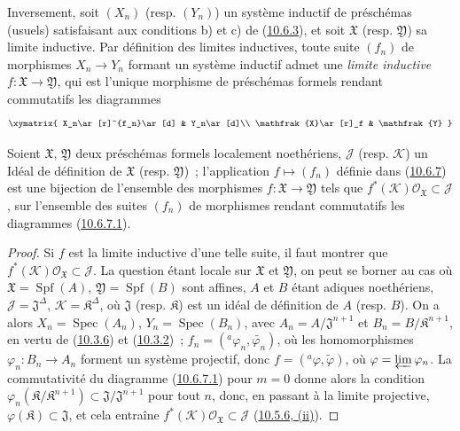 \begin{env}[10.6.8]
\label{I.10.6.8-fr}
Inversement, soit $(X_n)$ (resp. $(Y_n)$) un système inductif de
préschémas (usuels) satisfaisant aux conditions b) et c) de
(\hyperref[I.10.6.3-fr]{10.6.3}), et soit $\mathfrak{X}$ (resp.
$\mathfrak{Y}$) sa limite inductive. Par définition des limites
inductives, toute suite $(f_n)$ de morphismes $X_n\to Y_n$ formant un
système inductif admet une \emph{limite inductive}
$f:\mathfrak{X}\to\mathfrak{Y}$, qui est l'unique morphisme de
préschémas formels rendant commutatifs les diagrammes
\[
  \xymatrix{
    X_n\ar[r]^{f_n}\ar[d] &
    Y_n\ar[d]\\
    \mathfrak{X}\ar[r]_f &
    \mathfrak{Y}
  }
\]
\end{env}

\begin{proposition}[10.6.9]
\label{I.10.6.9-fr}
Soient $\mathfrak{X}$, $\mathfrak{Y}$ deux préschémas formels
localement noethériens, $\mathscr{J}$ (resp. $\mathscr{K}$) un Idéal
de définition de $\mathfrak{X}$ (resp. $\mathfrak{Y}$)~;
l'application $f\mapsto(f_n)$ définie dans
(\hyperref[I.10.6.7-fr]{10.6.7}) est une bijection de l'ensemble des
morphismes $f:\mathfrak{X}\to\mathfrak{Y}$ tels que
$f^*(\mathscr{K})\mathscr{O}_{\mathfrak{X}}\subset\mathscr{J}$, sur
l'ensemble des suites $(f_n)$ de morphismes rendant commutatifs les
diagrammes (\hyperref[I.10.6.7.1-fr]{10.6.7.1}).
\end{proposition}

\begin{proof}
Si $f$ est la limite inductive d'une telle suite, il faut montrer que
$f^*(\mathscr{K})\mathscr{O}_{\mathfrak{X}}\subset\mathscr{J}$. La
question étant locale sur $\mathfrak{X}$ et $\mathfrak{Y}$, on peut se
borner au cas où $\mathfrak{X}=\operatorname{Spf}(A)$,
$\mathfrak{Y}=\operatorname{Spf}(B)$ sont affines, $A$ et $B$ étant
adiques noethériens,
$\mathscr{J}=\mathfrak{J}^\Delta$,
$\mathscr{K}=\mathfrak{K}^\Delta$, où $\mathfrak{J}$ (resp.
$\mathfrak{K}$) est un idéal de définition de $A$ (resp. $B$). On a
alors $X_n=\operatorname{Spec}(A_n)$,
$Y_n=\operatorname{Spec}(B_n)$, avec
$A_n=A/\mathfrak{J}^{n+1}$ et $B_n=B/\mathfrak{K}^{n+1}$, en vertu de
(\hyperref[I.10.3.6-fr]{10.3.6}) et
(\hyperref[I.10.3.2-fr]{10.3.2})~;
$f_n=({}^a\varphi_n,\widetilde{\varphi_n})$, où les homomorphismes
$\varphi_n:B_n\to A_n$ forment un système projectif, donc
$f=({}^a\varphi,\widetilde{\varphi})$, où
$\varphi=\varprojlim\varphi_n$. La commutativité du diagramme
(\hyperref[I.10.6.7.1-fr]{10.6.7.1}) pour $m=0$ donne alors la
condition
$\varphi_n(\mathfrak{K}/\mathfrak{K}^{n+1})
\subset\mathfrak{J}/\mathfrak{J}^{n+1}$ pour tout $n$, donc, en
passant à la limite projective, $\varphi(\mathfrak{K})\subset
\mathfrak{J}$, et cela entraîne
$f^*(\mathscr{K})\mathscr{O}_{\mathfrak{X}}\subset\mathscr{J}$
(\hyperref[I.10.5.6-fr]{10.5.6, (ii)}).
\end{proof}

